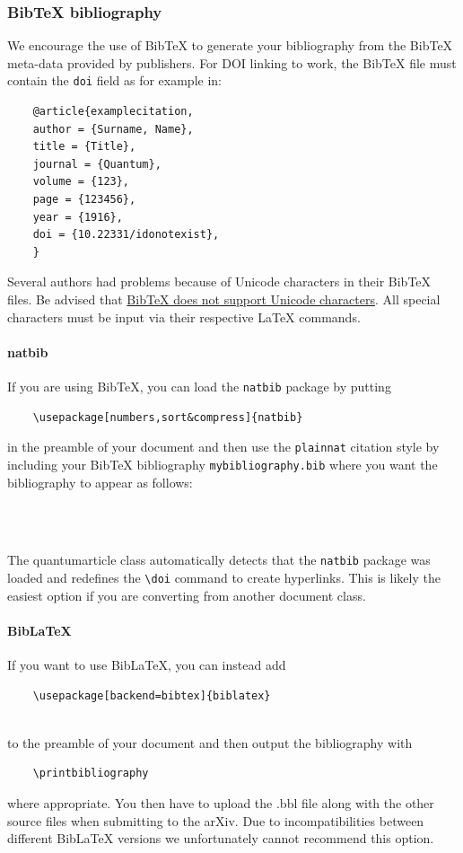 \documentclass[a4paper,noarxiv,onecolumn]{quantumarticle}
\begin{document}
	\subsubsection{BibTeX bibliography}
	We encourage the use of BibTeX to generate your bibliography from the BibTeX meta-data provided by publishers.
	For DOI linking to work, the BibTeX file must contain the \texttt{doi} field as for example in:
	\begin{verbatim}
	@article{examplecitation,
	author = {Surname, Name},
	title = {Title},
	journal = {Quantum},
	volume = {123},
	page = {123456},
	year = {1916},
	doi = {10.22331/idonotexist},
	}
	\end{verbatim}
	Several authors had problems because of Unicode characters in their BibTeX files.
	Be advised that \href{http://wiki.lyx.org/BibTeX/Tips}{BibTeX does not support Unicode characters}.
	All special characters must be input via their respective LaTeX commands.

	\paragraph{natbib}
	If you are using BibTeX, you can load the \texttt{natbib} package by putting
	\begin{verbatim}
	\usepackage[numbers,sort&compress]{natbib}
	\end{verbatim}
	in the preamble of your document and then use the \texttt{plainnat} citation style by including your BibTeX bibliography \texttt{mybibliography.bib} where you want the bibliography to appear as follows:
	\begin{verbatim}
	
	
	\end{verbatim}
	The quantumarticle class automatically detects that the \texttt{natbib} package was loaded and redefines the \texttt{\textbackslash{}doi} command to create hyperlinks.
	This is likely the easiest option if you are converting from another document class.

	\paragraph{BibLaTeX}
	If you want to use BibLaTeX, you can instead add
	\begin{verbatim}
	\usepackage[backend=bibtex]{biblatex}
	
	\end{verbatim}
	to the preamble of your document and then output the bibliography with
	\begin{verbatim}
	\printbibliography
	\end{verbatim}
	where appropriate.
	You then have to upload the .bbl file along with the other source files when submitting to the arXiv.
	Due to incompatibilities between different BibLaTeX versions we unfortunately cannot recommend this option.
\end{document}
